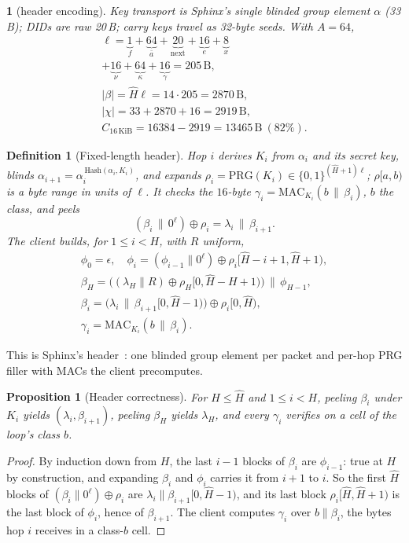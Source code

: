\documentclass[journal]{IEEEtran}
\newtheorem{definition}{Definition}
\newtheorem{proposition}{Proposition}
\newcommand{\namedhead}{}
\newtheorem*{namedenv}{\namedhead}
\newenvironment{defD}[2]{\renewcommand{\namedhead}{Definition #1}%
  \begin{namedenv}[#2]}{\end{namedenv}}
\newcommand{\nxt}{\mathrm{next}}
\newcommand{\Hm}{\hat H}
\newcommand{\PRG}{\mathrm{PRG}}
\newcommand{\MAC}{\mathrm{MAC}}
\begin{document}
\begin{defD}{D6$''$}{header encoding}
Key transport is Sphinx's single blinded group element $\alpha$ (33\,B);
DIDs are raw 20\,B; carry keys travel as 32-byte seeds.  With
$A=64$,
\begin{gather*}
\ell=\underbrace{1}_{f}+\underbrace{64}_{\bar a}+\underbrace{20}_{\nxt}
+\underbrace{16}_{e}+\underbrace{8}_{x}\\
+\underbrace{16}_{\nu}+\underbrace{64}_{\kappa}+\underbrace{16}_{\gamma}
=205\,\mathrm{B},\\
|\beta|=\Hm\ell=14\cdot205=2870\,\mathrm{B},\\
|\chi|=33+2870+16=2919\,\mathrm{B},\\
C_{16\,\mathrm{KiB}}=16384-2919=13465\,\mathrm{B}\ (82\%).
\end{gather*}
\end{defD}

\begin{definition}[Fixed-length header]\label{def:header}
Hop $i$ derives $K_i$ from $\alpha_i$ and its secret key, blinds
$\alpha_{i+1}=\alpha_i^{\,\mathrm{Hash}(\alpha_i,K_i)}$, and expands
$\rho_i=\PRG(K_i)\in\{0,1\}^{(\Hm+1)\ell}$; $\rho[a,b)$ is a byte range in
units of $\ell$.  It checks the $16$-byte $\gamma_i=\MAC_{K_i}(b\,\|\,\beta_i)$, $b$ the class, and peels
\[
(\beta_i\,\|\,0^{\ell})\oplus\rho_i=\lambda_i\,\|\,\beta_{i+1}.
\]
The client builds, for $1\le i<H$, with $R$ uniform,
\begin{gather*}
\phi_0=\epsilon,\quad
\phi_i=(\phi_{i-1}\|0^{\ell})\oplus\rho_i[\Hm{-}i{+}1,\Hm{+}1),\\
\beta_H=\bigl((\lambda_H\|R)\oplus\rho_H[0,\Hm{-}H{+}1)\bigr)\,\|\,
\phi_{H-1},\\
\beta_i=\bigl(\lambda_i\,\|\,\beta_{i+1}[0,\Hm{-}1)\bigr)\oplus
\rho_i[0,\Hm),\\
\gamma_i=\MAC_{K_i}(b\,\|\,\beta_i).
\end{gather*}
\end{definition}

This is Sphinx's header~\cite{Danezis2009}: one blinded group element
per packet and per-hop PRG filler with MACs the client precomputes.

\begin{proposition}[Header correctness]\label{prop:header}
For $H\le\Hm$ and $1\le i<H$, peeling $\beta_i$ under $K_i$ yields
$(\lambda_i,\beta_{i+1})$, peeling $\beta_H$ yields $\lambda_H$, and every
$\gamma_i$ verifies on a cell of the loop's class $b$.
\end{proposition}
\begin{proof}
By induction down from $H$, the last $i-1$ blocks of $\beta_i$ are
$\phi_{i-1}$: true at $H$ by construction, and expanding $\beta_i$ and
$\phi_i$ carries it from $i+1$ to $i$.  So the first $\Hm$ blocks of
$(\beta_i\|0^\ell)\oplus\rho_i$ are $\lambda_i\|\beta_{i+1}[0,\Hm{-}1)$,
and its last block $\rho_i[\Hm,\Hm{+}1)$ is the last block of $\phi_i$,
hence of $\beta_{i+1}$.  The client computes $\gamma_i$ over $b\|\beta_i$,
the bytes hop $i$ receives in a class-$b$ cell.
\end{proof}
\end{document}
